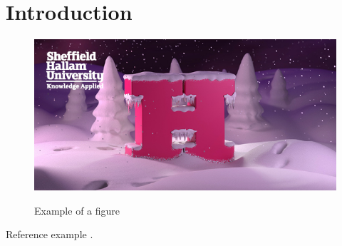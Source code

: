 \chapter{Introduction}

\begin{figure}[!htb]
    \caption{Example of a figure}
    \centering 
    \includegraphics[scale=0.5]{img.png}
    \label{figure:img}
\end{figure}


Reference example \cite{Abreu:2010}.